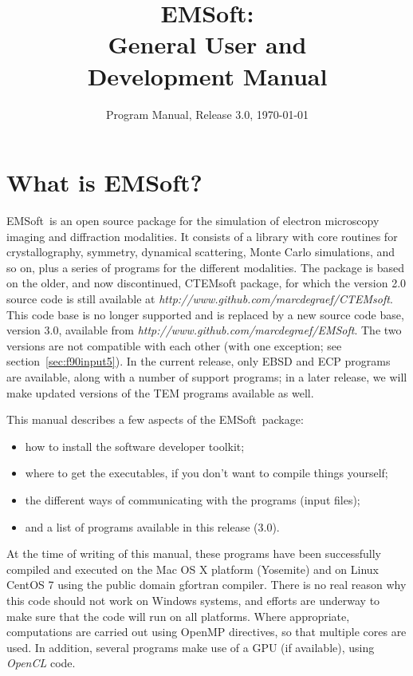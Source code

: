 \documentclass[DIV=calc, paper=letter, fontsize=11pt]{scrartcl}	 %
\title{EMSoft:\\ General User and\\ Development Manual} %
\author{\vspace*{-0.7in}} %
\date{Program Manual, Release 3.0, \today}
\newcommand{\ctp}{\textsf{EMSoft}}
\newcommand{\ctpb}{\textbf{\textsf{EMSoft}}}
\begin{document}
\maketitle

\renewcommand{\contentsname}{Table of Contents}
{\small\tableofcontents}

\newpage
\section{What is \ctpb?}
\ctp\ is an open source package for the simulation of electron microscopy imaging and diffraction modalities.  It consists of a library with
core routines for crystallography, symmetry, dynamical scattering, Monte Carlo simulations, and so on, plus a series of programs for the different modalities.
The package is based on the older, and now discontinued, \textsf{CTEMsoft} package, for which the version 2.0 source code is still
available at \textit{http://www.github.com/marcdegraef/CTEMsoft}.  This code base is no longer supported and is replaced
by a new source code base, version 3.0, available from \textit{http://www.github.com/marcdegraef/EMSoft}.  The two versions are not 
compatible with each other (with one exception; see section~\ref{sec:f90input5}).  In the current release, only EBSD and ECP programs are
available, along with a number of support programs; in a later release, we will make updated versions of the TEM programs available as well.

This manual describes a few aspects of the \ctp\ package:
\begin{itemize}
\item how to install the software developer toolkit;
\item where to get the executables, if you don't want to compile things yourself;
\item the different ways of communicating with the programs (input files);
\item and a list of programs available in this release (3.0).
\end{itemize}

At the time of writing of this manual, these programs have been successfully compiled and executed on the Mac OS X platform (Yosemite) and on 
Linux CentOS 7 using the public domain gfortran compiler. There is no real reason why this code should not work on Windows systems, and efforts are underway
to make sure that the code will run on all platforms. Where appropriate, computations
are carried out using \textsf{OpenMP} directives, so that multiple cores are used.  In addition, several programs make use of a 
GPU (if available), using \textit{OpenCL} code.
\end{document}
